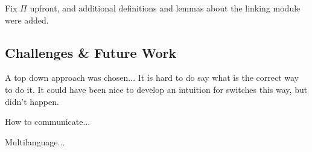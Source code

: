 \documentclass[runningheads, orivec]{llncs}
\begin{document}
Fix $\Pi$ upfront, and additional definitions and lemmas about the linking module were added.

\subsection{Challenges \& Future Work}

A top down approach was chosen...
It is hard to do say what is the correct way to do it. It could have been nice to develop an intuition for switches this way, but didn't happen.

How to communicate...

Multilanguage...


\end{document}
